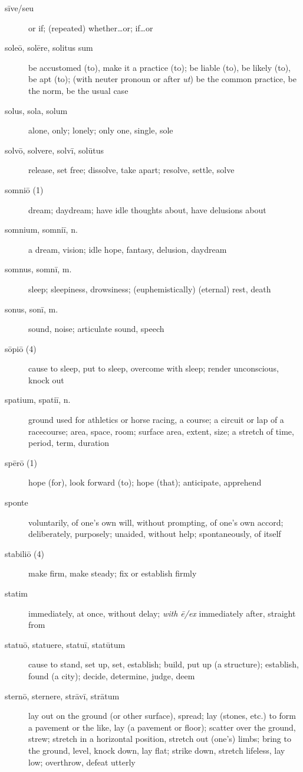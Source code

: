 \begin{description}
    \item[sīve/seu] or if; (repeated) whether\dots or; if\dots or
    \item[soleō, solēre, solitus sum] be accustomed (to), make it a practice (to); be liable (to), be likely (to), be apt (to); (with neuter pronoun or after \textit{ut}) be the common practice, be the norm, be the usual case
    \item[solus, sola, solum] alone, only; lonely; only one, single, sole
    \item[solvō, solvere, solvī, solūtus] release, set free; dissolve, take apart; resolve, settle, solve
    \item[somniō (1)] dream; daydream; have idle thoughts about, have delusions about
    \item[somnium, somniī, n.] a dream, vision; idle hope, fantasy, delusion, daydream
    \item[somnus, somnī, m.] sleep; sleepiness, drowsiness; (euphemistically) (eternal) rest, death
    \item[sonus, sonī, m.] sound, noise; articulate sound, speech
    \item[sōpiō (4)] cause to sleep, put to sleep, overcome with sleep; render unconscious, knock out
    \item[spatium, spatiī, n.] ground used for athletics or horse racing, a course; a circuit or lap of a racecourse; area, space, room; surface area, extent, size; a stretch of time, period, term, duration
    \item[spērō (1)] hope (for), look forward (to); hope (that); anticipate, apprehend
    \item[sponte] voluntarily, of one's own will, without prompting, of one's own accord; deliberately, purposely; unaided, without help; spontaneously, of itself
    \item[stabiliō (4)] make firm, make steady; fix or establish firmly
    \item[statim] immediately, at once, without delay; \textit{with ē/ex} immediately after, straight from
    \item[statuō, statuere, statuī, statūtum] cause to stand, set up, set, establish; build, put up (a structure); establish, found (a city); decide, determine, judge, deem
    \item[sternō, sternere, strāvī, strātum] lay out on the ground (or other surface), spread; lay (stones, etc.) to form a pavement or the like, lay (a pavement or floor); scatter over the ground, strew; stretch in a horizontal position, stretch out (one's) limbs; bring to the ground, level, knock down, lay flat; strike down, stretch lifeless, lay low; overthrow, defeat utterly

\end{description}
